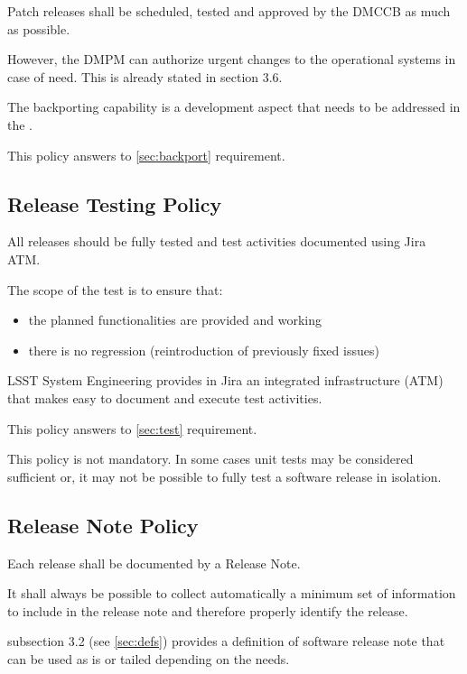 Patch releases shall be scheduled, tested and approved by the DMCCB as much as possible.

However, the DMPM can authorize urgent changes to the operational systems in case of need.
This is already stated in  section 3.6.

The backporting capability is a development aspect that needs to be addressed in the .

This policy answers to \ref{sec:backport} requirement.


\subsection{Release Testing Policy} \label{sec:testpolicy}

All releases should be fully tested and test activities documented using Jira ATM.

The scope of the test is to ensure that:

\begin{itemize}
\item the planned functionalities are provided and working
\item there is no regression (reintroduction of previously fixed issues)
\end{itemize}

LSST System Engineering provides in Jira an integrated infrastructure (ATM) that makes easy to document and execute test activities.

This policy answers to \ref{sec:test} requirement.

This policy is not mandatory.
In some cases unit tests may be considered sufficient or, it may not be possible to fully test a software release in isolation.


\subsection{Release Note Policy} \label{sec:notepolicy}

Each release shall be documented by a Release Note.

It shall always be possible to collect automatically a minimum set of information to include in the release note and therefore properly identify the release.

 subsection 3.2 (see \ref{sec:defs}) provides a definition of software release note that can be used as is or tailed depending on the needs.

